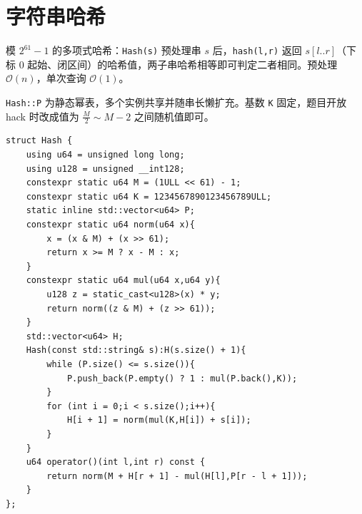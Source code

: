 \section{字符串哈希}

模 $2^{61}-1$ 的多项式哈希：\texttt{Hash(s)} 预处理串 $s$ 后，\texttt{hash(l,r)} 返回 $s[l..r]$（下标 $0$ 起始、闭区间）的哈希值，两子串哈希相等即可判定二者相同。预处理 $\mathcal{O}(n)$，单次查询 $\mathcal{O}(1)$。

\texttt{Hash::P} 为静态幂表，多个实例共享并随串长懒扩充。基数 \texttt{K} 固定，题目开放 hack 时改成值为 $\frac{M}{2} \sim M-2$ 之间随机值即可。

\begin{lstlisting}
struct Hash {
    using u64 = unsigned long long;
    using u128 = unsigned __int128;
    constexpr static u64 M = (1ULL << 61) - 1;
    constexpr static u64 K = 1234567890123456789ULL;
    static inline std::vector<u64> P;
    constexpr static u64 norm(u64 x){
        x = (x & M) + (x >> 61);
        return x >= M ? x - M : x;
    }
    constexpr static u64 mul(u64 x,u64 y){
        u128 z = static_cast<u128>(x) * y;
        return norm((z & M) + (z >> 61));
    }
    std::vector<u64> H;
    Hash(const std::string& s):H(s.size() + 1){
        while (P.size() <= s.size()){
            P.push_back(P.empty() ? 1 : mul(P.back(),K));
        }
        for (int i = 0;i < s.size();i++){
            H[i + 1] = norm(mul(K,H[i]) + s[i]);
        }
    }
    u64 operator()(int l,int r) const {
        return norm(M + H[r + 1] - mul(H[l],P[r - l + 1]));
    }
};
\end{lstlisting}
